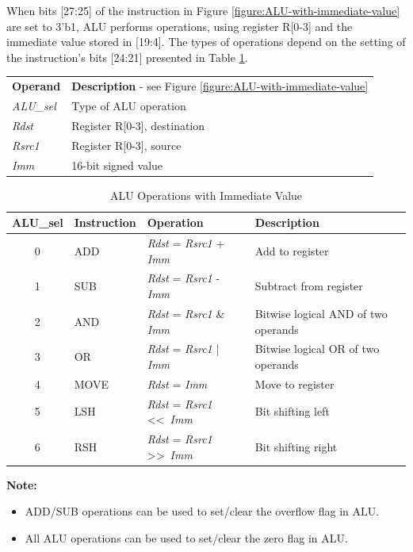 \documentclass[main\_\_EN.tex]{subfiles}
\begin{document}
When bits [27:25] of the instruction in Figure \ref{figure:ALU-with-immediate-value} are set to 3'b1, ALU performs operations, using register R[0-3] and the immediate value stored in [19:4]. The types of operations depend on the setting of the instruction's bits [24:21] presented in Table \ref{table:ALU-with-immediate-value}.

\begin{tabular}{ l l }
\textbf{Operand} & \textbf{Description} - see Figure \ref{figure:ALU-with-immediate-value} \\
\textit{ALU\_sel} & Type of ALU operation \\
\textit{Rdst} & Register R[0-3], destination \\
\textit{Rsrc1} & Register R[0-3], source \\
\textit{Imm} & 16-bit signed value
\end{tabular}

\begin{table}[H]
    \centering
    \begin{tabular}{ c l l l }
    \textbf{ALU\_sel} & \textbf{Instruction} & \textbf{Operation} & \textbf{Description} \\ \hline
    0 & ADD & \textit{Rdst} = \textit{Rsrc1} + \textit{Imm} & Add to register \\
    1 & SUB & \textit{Rdst} = \textit{Rsrc1} - \textit{Imm} & Subtract from register \\
    2 & AND & \textit{Rdst} = \textit{Rsrc1} \& \textit{Imm} & Bitwise logical AND of two operands \\
    3 & OR & \textit{Rdst} = \textit{Rsrc1} | \textit{Imm} & Bitwise logical OR of two operands \\
    4 & MOVE & \textit{Rdst} = \textit{Imm} & Move to register \\
    5 & LSH & \textit{Rdst} = \textit{Rsrc1} \textless\textless\  \textit{Imm} & Bit shifting left \\
    6 & RSH & \textit{Rdst} = \textit{Rsrc1} \textgreater\textgreater\  \textit{Imm} & Bit shifting right \\
    \end{tabular}
    \caption{ALU Operations with Immediate Value}
    \label{table:ALU-with-immediate-value}
\end{table}

\textbf{Note:}
\begin{itemize}
    \item ADD/SUB operations can be used to set/clear the overflow flag in ALU.
    \item All ALU operations can be used to set/clear the zero flag in ALU.
\end{itemize}
\end{document}
